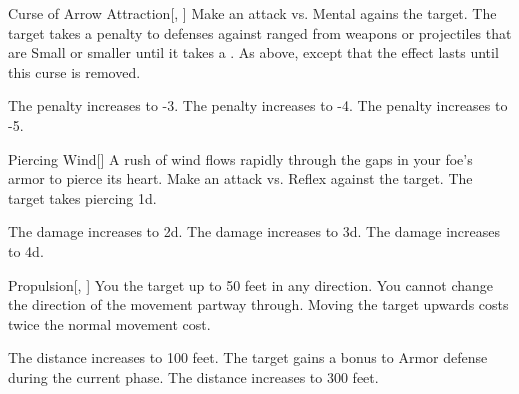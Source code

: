\lowercase{\hypertarget{spell:Curse of Arrow Attraction}{}}\label{spell:Curse of Arrow Attraction}
\begin{freeability}[Rank 1]{\hypertarget{spell:Curse of Arrow Attraction}{Curse of Arrow Attraction}}[, ]
Make an attack vs. Mental agains the target.
\hit The target takes a  penalty to defenses against ranged  from weapons or projectiles that are Small or smaller until it takes a .
\crit As above, except that the effect lasts until this curse is removed.

\rankline
{} The penalty increases to -3.
 The penalty increases to -4.
 The penalty increases to -5.
\end{freeability}
\vspace{0.25em}



\lowercase{\hypertarget{spell:Piercing Wind}{}}\label{spell:Piercing Wind}
\begin{freeability}[Rank 1]{\hypertarget{spell:Piercing Wind}{Piercing Wind}}[]
A rush of wind flows rapidly through the gaps in your foe's armor to pierce its heart.
Make an attack vs. Reflex against the target.
\hit The target takes piercing  \plus1d.

\rankline
{} The damage increases to  \plus2d.
 The damage increases to  \plus3d.
 The damage increases to  \plus4d.
\end{freeability}
\vspace{0.25em}



\lowercase{\hypertarget{spell:Propulsion}{}}\label{spell:Propulsion}
\begin{freeability}[Rank 1]{\hypertarget{spell:Propulsion}{Propulsion}}[, ]
You  the target up to 50 feet in any direction.
You cannot change the direction of the movement partway through.
Moving the target upwards costs twice the normal movement cost.

\rankline
{} The distance increases to 100 feet.
 The target gains a  bonus to Armor defense during the current phase.
 The distance increases to 300 feet.
\end{freeability}
\vspace{0.25em}



